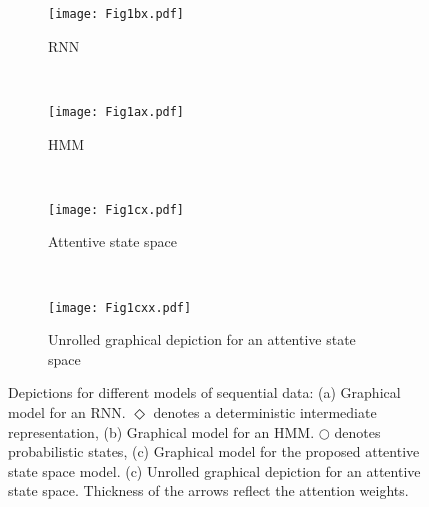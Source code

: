 \documentclass[twoside,11pt]{article}
\begin{document}
\begin{figure*}[t!] 
    \centering
    \begin{subfigure}[t]{0.32\textwidth}
        \centering
        \texttt{[image: Fig1bx.pdf]}
        \caption{\footnotesize RNN}
				\label{fig1a}
    \end{subfigure}~ 
    \begin{subfigure}[t]{0.32\textwidth}
        \centering
        \texttt{[image: Fig1ax.pdf]}
        \caption{\footnotesize HMM}
				\label{fig1b}
    \end{subfigure}
		 ~ 
    \begin{subfigure}[t]{0.32\textwidth}
        \centering
        \texttt{[image: Fig1cx.pdf]}
        \caption{\footnotesize Attentive state space}
				\label{fig1c}
		 \end{subfigure}		
				 ~ 
    \begin{subfigure}[t]{0.64\textwidth}
        \centering
        \texttt{[image: Fig1cxx.pdf]}
        \caption{\footnotesize Unrolled graphical depiction for an attentive state space}
				\label{fig1c2}
		 \end{subfigure}		
    \caption{\footnotesize Depictions for different models of sequential data: (a) Graphical model for an RNN. $\Diamond$ denotes a deterministic intermediate representation, (b) Graphical model for an HMM. $\bigcirc$ denotes probabilistic states, (c) Graphical model for the proposed attentive state space model. (c) Unrolled graphical depiction for an attentive state space. Thickness of the arrows reflect the attention weights.}
\end{figure*}
\end{document}
